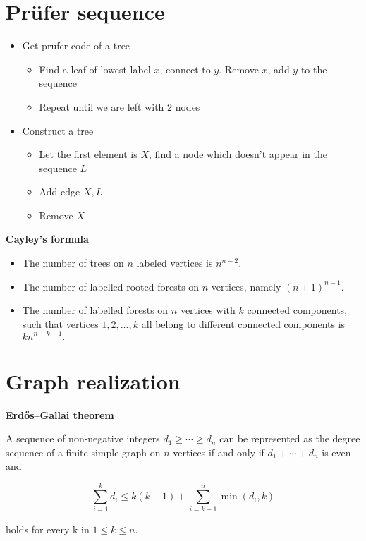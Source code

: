 \documentclass[11pt]{article}
\begin{document}
\begin{multicols}{3}
\section{Prüfer sequence}

\begin{itemize}
    \item Get prufer code of a tree
    \begin{itemize}
        \item Find a leaf of lowest label $x$, connect to $y$. Remove $x$, add $y$ to the sequence
        \item Repeat until we are left with 2 nodes
    \end{itemize}
    \item Construct a tree
    \begin{itemize}
        \item Let the first element is $X$, find a node which doesn't appear in the sequence $L$
        \item Add edge $X, L$
        \item Remove $X$
    \end{itemize}
\end{itemize}

\textbf{Cayley's formula}
\begin{itemize}
    \item The number of trees on $n$ labeled vertices is $n ^ {n - 2}$.
    \item The number of labelled rooted forests on $n$ vertices, namely $(n + 1)^{n - 1}$.
    \item The number of labelled forests on $n$ vertices with $k$ connected components, such that vertices $1, 2, \dots, k$ all belong to different connected components is $kn^{n-k-1}.$
\end{itemize}

\section{Graph realization}

\textbf{Erdős–Gallai theorem}

A sequence of non-negative integers $ d_{1}\geq \cdots \geq d_{n}$ can be represented as the degree sequence of a finite simple graph on $n$ vertices if and only if $d_{1}+\cdots +d_{n}$ is even and

$$\sum _{i=1}^{k}d_{i}\leq k(k-1)+\sum _{i=k+1}^{n}\min(d_{i},k)$$

holds for every k in $1\leq k\leq n$.


\end{multicols}
\end{document}
